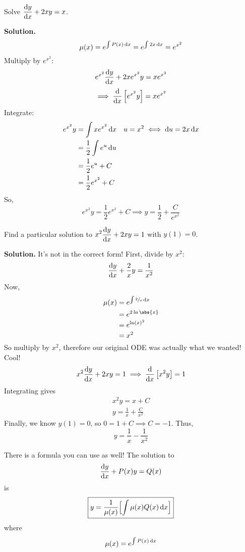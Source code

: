 \begin{Example}{}{}
    Solve
    $ \displaystyle  \odv{y}{x} +2xy=x $.

    \textbf{Solution.}
    \[ \mu(x)=e^{\int P(x)\odif{x}}=e^{\int 2x\odif{x}}=e^{x^2} \]
    Multiply by $ e^{x^2} $:
    \[ e^{x^2}\odv{y}{x} +2xe^{x^2}y=xe^{x^2} \]
    \[ \implies \odv{}{x} \left[ e^{x^2}y \right]=xe^{x^2} \]
    Integrate:
    \begin{align*}
        e^{x^2}y
         & =\int x e^{x^2}\odif{x}       & u=x^2\iff \odif{u}=2x\odif{x} \\
         & =\frac{1}{2} \int e^u\odif{u}                                 \\
         & =\frac{1}{2} e^{u}+C                                          \\
         & =\frac{1}{2}e^{x^2}+C
    \end{align*}
    So,
    \[ e^{x^2}y=\frac{1}{2} e^{x^2}+C\implies y=\frac{1}{2} +\frac{C}{e^{x^2}} \]
\end{Example}

\begin{Example}{}{}
    Find a particular solution to
    $ \displaystyle  x^2 \odv{y}{x} +2xy=1 $
    with $ y(1)=0 $.

    \textbf{Solution.} It's not in the correct form! First, divide by $ x^2 $:
    \[ \odv{y}{x} +\frac{2}{x} y=\frac{1}{x^2}  \]
    Now,
    \begin{align*}
        \mu(x)
         & =e^{\int \sfrac{2}{x} \odif{x} } \\
         & =e^{2\ln\abs{x}}                 \\
         & =e^{\ln(x)^2}                    \\
         & =x^2
    \end{align*}
    So multiply by $ x^2 $, therefore our original ODE was actually what we wanted! Cool!
    \[ x^2\odv{y}{x} +2xy=1
        \implies\odv{}{x} \left[ x^2y \right]=1 \]
    Integrating gives
    \begin{align*}
        x^2 y=x+C \\
        y=\frac{1}{x} +\frac{C}{x^2}
    \end{align*}
    Finally, we know $ y(1)=0 $, so $ 0=1+C\implies C=-1 $. Thus,
    \[ y=\frac{1}{x} -\frac{1}{x^2} \]
\end{Example}

\begin{Remark}{}{}
    There is a formula you can use as well! The solution to
    \[ \odv{y}{x}+P(x)y=Q(x) \]
    is
    \[ \boxed{y=\frac{1}{\mu(x)}\Bigl[\int \mu(x)Q(x)\odif{x} \Bigr]}  \]
    where
    \[ \mu(x)=e^{\int P(x)\odif{x}} \]
\end{Remark}

